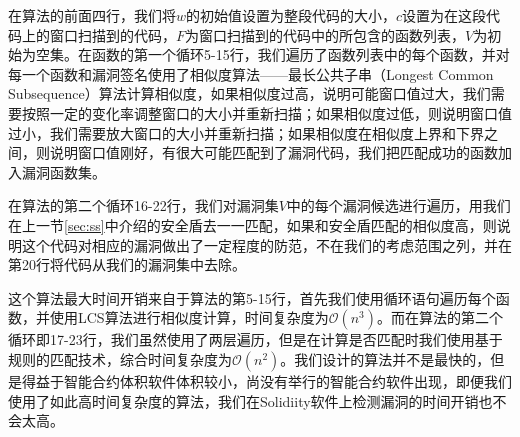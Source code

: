 在算法的前面四行，我们将$w$的初始值设置为整段代码的大小，$c$设置为在这段代码上的窗口扫描到的代码，$F$为窗口扫描到的代码中的所包含的函数列表，$V$为初始为空集。在函数的第一个循环5-15行，我们遍历了函数列表中的每个函数，并对每一个函数和漏洞签名使用了相似度算法——最长公共子串（Longest Common Subsequence）算法计算相似度，如果相似度过高，说明可能窗口值过大，我们需要按照一定的变化率调整窗口的大小并重新扫描；如果相似度过低，则说明窗口值过小，我们需要放大窗口的大小并重新扫描；如果相似度在相似度上界和下界之间，则说明窗口值刚好，有很大可能匹配到了漏洞代码，我们把匹配成功的函数加入漏洞函数集。

在算法的第二个循环16-22行，我们对漏洞集$V$中的每个漏洞候选进行遍历，用我们在上一节\ref{sec:ss}中介绍的安全盾去一一匹配，如果和安全盾匹配的相似度高，则说明这个代码对相应的漏洞做出了一定程度的防范，不在我们的考虑范围之列，并在第20行将代码从我们的漏洞集中去除。

这个算法最大时间开销来自于算法的第5-15行，首先我们使用循环语句遍历每个函数，并使用LCS算法进行相似度计算，时间复杂度为$\mathcal{O}(n^{3})$。而在算法的第二个循环即17-23行，我们虽然使用了两层遍历，但是在计算是否匹配时我们使用基于规则的匹配技术，综合时间复杂度为$\mathcal{O}(n^{2})$。我们设计的算法并不是最快的，但是得益于智能合约体积软件体积较小，尚没有举行的智能合约软件出现，即便我们使用了如此高时间复杂度的算法，我们在Solidiity软件上检测漏洞的时间开销也不会太高。
